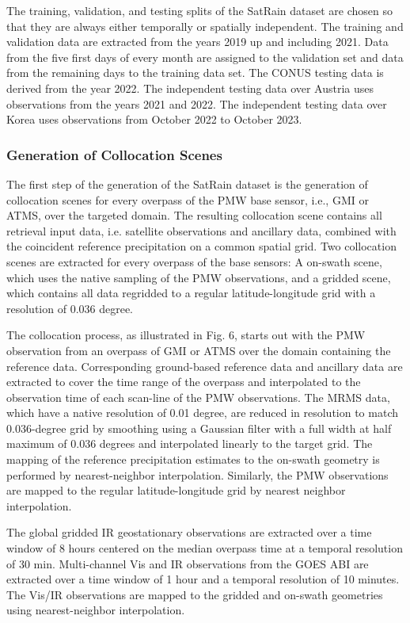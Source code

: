 \documentclass[11pt]{article}
\begin{document}
The training, validation, and testing splits of the SatRain dataset are chosen so that they are always either temporally or spatially independent. The training and validation data are extracted from the years 2019 up and including 2021. Data from the five first days of every month are assigned to the validation set and data from the remaining days to the training data set. The CONUS testing data is derived from the year 2022. The independent testing data over Austria uses observations from the years 2021 and 2022. The independent testing data over Korea uses observations from October 2022 to October 2023.

\subsubsection{Generation of Collocation Scenes}

The first step of the generation of the SatRain dataset is the generation of
collocation scenes for every overpass of the PMW base sensor, i.e., GMI or ATMS,
over the targeted domain. The resulting collocation scene contains all retrieval
input data, i.e. satellite observations and ancillary data, combined with the
coincident reference precipitation on a common spatial grid. Two collocation
scenes are extracted for every overpass of the base sensors: A on-swath scene,
which uses the native sampling of the PMW observations, and a gridded scene,
which contains all data regridded to a regular latitude-longitude grid with a
resolution of 0.036 degree.

The collocation process, as illustrated in Fig. 6, starts out with the PMW
observation from an overpass of GMI or ATMS over the domain containing the
reference data. Corresponding ground-based reference data and ancillary data are
extracted to cover the time range of the overpass and interpolated to the
observation time of each scan-line of the PMW observations. The MRMS data, which
have a native resolution of 0.01 degree, are reduced in resolution to match
0.036-degree grid by smoothing using a Gaussian filter with a full width at half
maximum of 0.036 degrees and interpolated linearly to the target grid. The
mapping of the reference precipitation estimates to the on-swath geometry is
performed by nearest-neighbor interpolation. Similarly, the PMW observations are
mapped to the regular latitude-longitude grid by nearest neighbor interpolation.

The global gridded IR geostationary observations are extracted over a time
window of 8 hours centered on the median overpass time at a temporal resolution
of 30 min. Multi-channel Vis and IR observations from the GOES ABI are extracted
over a time window of 1 hour and a temporal resolution of 10 minutes. The Vis/IR
observations are mapped to the gridded and on-swath geometries using
nearest-neighbor interpolation.
\end{document}
